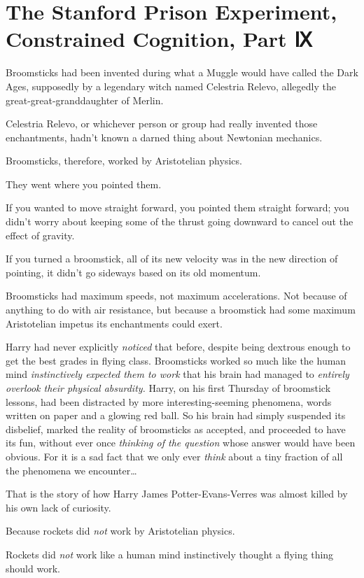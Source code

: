\chapter{The Stanford Prison Experiment, Constrained Cognition, Part Ⅸ}

Broomsticks had been invented during what a Muggle would have called the
Dark Ages, supposedly by a legendary witch named Celestria Relevo,
allegedly the great-great-granddaughter of Merlin.

Celestria Relevo, or whichever person or group had really invented those
enchantments, hadn't known a darned thing about Newtonian mechanics.

Broomsticks, therefore, worked by Aristotelian physics.

They went where you pointed them.

If you wanted to move straight forward, you pointed them straight
forward; you didn't worry about keeping some of the thrust going
downward to cancel out the effect of gravity.

If you turned a broomstick, all of its new velocity was in the new
direction of pointing, it didn't go sideways based on its old momentum.

Broomsticks had maximum speeds, not maximum accelerations. Not because
of anything to do with air resistance, but because a broomstick had some
maximum Aristotelian impetus its enchantments could exert.

Harry had never explicitly \emph{noticed} that before, despite being
dextrous enough to get the best grades in flying class. Broomsticks
worked so much like the human mind \emph{instinctively expected them to
work} that his brain had managed to \emph{entirely overlook their
physical absurdity.} Harry, on his first Thursday of broomstick lessons,
had been distracted by more interesting-seeming phenomena, words written
on paper and a glowing red ball. So his brain had simply suspended its
disbelief, marked the reality of broomsticks as accepted, and proceeded
to have its fun, without ever once \emph{thinking of the question} whose
answer would have been obvious. For it is a sad fact that we only ever
\emph{think} about a tiny fraction of all the phenomena we
encounter\ldots{}

That is the story of how Harry James Potter-Evans-Verres was almost
killed by his own lack of curiosity.

Because rockets did \emph{not} work by Aristotelian physics.

Rockets did \emph{not} work like a human mind instinctively thought a
flying thing should work.


